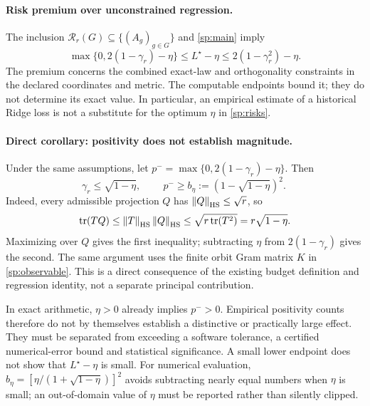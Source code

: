 \paragraph{Risk premium over unconstrained regression.}
\label{sp:risk-premium}
The inclusion $\mathcal R_r(G)\subseteq\{(A_g)_{g\in G}\}$ and \cref{sp:main} imply
\[
 \max\{0,2(1-\gamma_r)-\eta\}\le L^\star-\eta
 \le2(1-\gamma_r^2)-\eta.
\]
The premium concerns the combined exact-law and orthogonality constraints in the declared coordinates and metric. The computable endpoints bound it; they do not determine its exact value. In particular, an empirical estimate of a historical Ridge loss is not a substitute for the optimum $\eta$ in \cref{sp:risks}.

\paragraph{Direct corollary: positivity does not establish magnitude.}
Under the same assumptions, let $p^-=\max\{0,2(1-\gamma_r)-\eta\}$. Then
\begin{equation}
 \gamma_r\le\sqrt{1-\eta},\qquad
 \boxed{\ p^-\ge b_\eta:=(1-\sqrt{1-\eta})^2.\ }
 \label{sp:premium-positivity}
\end{equation}
Indeed, every admissible projection $Q$ has $\left\lVert Q\right\rVert_{\mathrm{HS}}\le\sqrt r$, so
\[
 \operatorname{tr}(TQ)
 \le\left\lVert T\right\rVert_{\mathrm{HS}}\left\lVert Q\right\rVert_{\mathrm{HS}}
 \le\sqrt{r\operatorname{tr}(T^2)}
 =r\sqrt{1-\eta}.
\]
Maximizing over $Q$ gives the first inequality; subtracting $\eta$ from $2(1-\gamma_r)$ gives the second. The same argument uses the finite orbit Gram matrix $K$ in \cref{sp:observable}. This is a direct consequence of the existing budget definition and regression identity, not a separate principal contribution.

In exact arithmetic, $\eta>0$ already implies $p^->0$. Empirical positivity counts therefore do not by themselves establish a distinctive or practically large effect. They must be separated from exceeding a software tolerance, a certified numerical-error bound and statistical significance. A small lower endpoint does not show that $L^\star-\eta$ is small. For numerical evaluation, $b_\eta=[\eta/(1+\sqrt{1-\eta})]^2$ avoids subtracting nearly equal numbers when $\eta$ is small; an out-of-domain value of $\eta$ must be reported rather than silently clipped.

